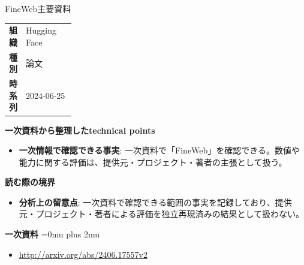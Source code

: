 \begin{technicalnote}{FineWeb}{主要資料}
\begingroup
\begin{tabularx}{\linewidth}{@{}>{\bfseries}p{0.22\linewidth}X@{}}
組織 & Hugging Face \\
種別 & 論文 \\
時系列 & 2024-06-25 \\
\end{tabularx}
\smallskip
{\bfseries 一次資料から整理したtechnical points}
\begin{itemize}[leftmargin=1.5em,itemsep=0.35em]
\item \textbf{一次情報で確認できる事実}: 一次資料で「FineWeb」を確認できる。数値や能力に関する評価は、提供元・プロジェクト・著者の主張として扱う。
\end{itemize}
\begin{minipage}{\linewidth}
{\bfseries 読む際の境界}
\begin{itemize}[leftmargin=1.5em,itemsep=0.35em]
\item \textbf{分析上の留意点}: 一次資料で確認できる範囲の事実を記録しており、提供元・プロジェクト・著者による評価を独立再現済みの結果として扱わない。
\end{itemize}
\begin{samepage}
{\bfseries 一次資料}
\begingroup\sloppy
\Urlmuskip=0mu plus 2mu\relax
\begin{itemize}[leftmargin=1.5em,itemsep=0.25em]
\item {\scriptsize\url{http://arxiv.org/abs/2406.17557v2}}
\end{itemize}
\endgroup
\end{samepage}
\end{minipage}
\endgroup
\end{technicalnote}
\medskip


